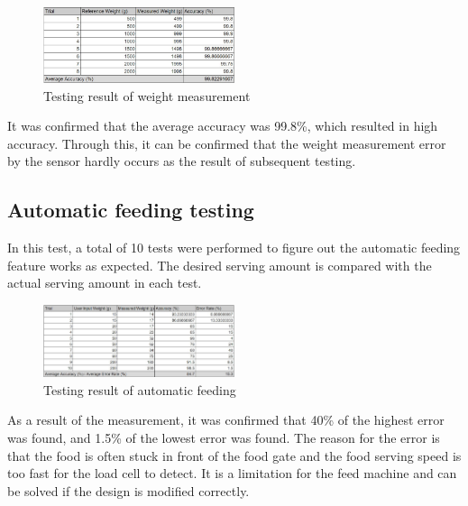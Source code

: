 \documentclass[conference]{IEEEtran}
\begin{document}
\begin{figure}[htbp]
\centerline{\includegraphics[width=0.5\textwidth]{./images/Calibration_sheet.jpg}}
\caption{Testing result of weight measurement}
\label{fig}
\end{figure}

It was confirmed that the average accuracy was 99.8\%, which resulted in high accuracy. Through this, it can be confirmed that the weight measurement error by the sensor hardly occurs as the result of subsequent testing.

\subsection{Automatic feeding testing}
In this test, a total of 10 tests were performed to figure out the automatic feeding feature works as expected. The desired serving amount is compared with the actual serving amount in each test.

\begin{figure}[htbp]
\centerline{\includegraphics[width=0.5\textwidth]{./images/Feeding_sheet.jpg}}
\caption{Testing result of automatic feeding}
\label{fig}
\end{figure}

As a result of the measurement, it was confirmed that 40\% of the highest error was found, and 1.5\% of the lowest error was found. The reason for the error is that the food is often stuck in front of the food gate and the food serving speed is too fast for the load cell to detect. It is a limitation for the feed machine and can be solved if the design is modified correctly.

\end{document}
